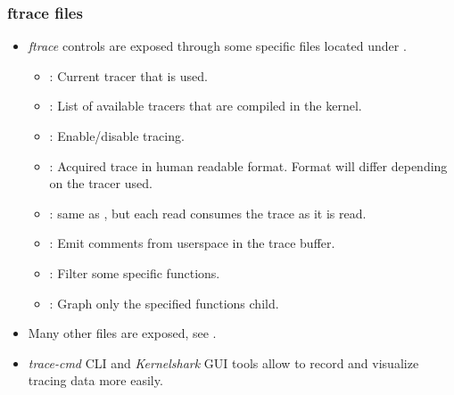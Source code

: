 \begin{frame}
  \frametitle{ftrace files}
  \begin{itemize}
    \item {\em ftrace} controls are exposed through some specific files located under
          .
    \begin{itemize}
      \item {}: Current tracer that is used.
      \item {}: List of available tracers that are
            compiled in the kernel.
      \item {}: Enable/disable tracing.
      \item {}: Acquired trace in human readable format. Format will
            differ depending on the tracer used.
      \item {}: same as , but each read consumes the
      trace as it is read.
      \item {}: Emit comments from userspace in the
            trace buffer.
      \item {}: Filter some specific functions.
      \item {}: Graph only the specified functions child.
    \end{itemize}
    \item Many other files are exposed, see .
    \item {\em trace-cmd} CLI and {\em Kernelshark} GUI tools allow to record
          and visualize tracing data more easily.
  \end{itemize}
\end{frame}

